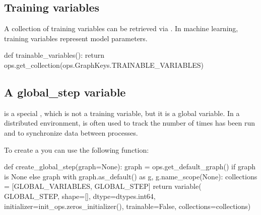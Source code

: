 \begin{content}
\subsection{Training variables}
A collection of training variables can be retrieved via . In machine learning, training variables represent model parameters.

\begin{leftbar}
\begin{python}
def trainable_variables():
  return ops.get_collection(ops.GraphKeys.TRAINABLE_VARIABLES)
\end{python}
\end{leftbar}


\subsection{A global\_step variable}
 is a special , which is not a training variable, but it is a global variable. In a distributed environment,  is often used to track the number of times  has been run and to synchronize data between processes.

To create a  you can use the following function:

\begin{leftbar}
\begin{python}
def create_global_step(graph=None):
  graph = ops.get_default_graph() if graph is None else graph
  with graph.as_default() as g, g.name_scope(None):
    collections = [GLOBAL_VARIABLES, GLOBAL_STEP]
    return variable(
        GLOBAL_STEP,
        shape=[],
        dtype=dtypes.int64,
        initializer=init_ops.zeros_initializer(),
        trainable=False,
        collections=collections)
\end{python}
\end{leftbar}

\end{content}


